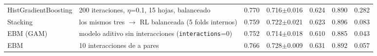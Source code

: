\begin{table}[t]
\begin{tabular}{@{}p{2.9cm}p{7.6cm}ccccc@{}}
HistGradientBoosting & 200 iteraciones, $\eta$=0.1, 15 hojas, balanceado & 0.770 & 0.716$\pm$0.016 & 0.624 & 0.890 & 0.282 \\
Stacking & los mismos tres $\rightarrow$ RL balanceada (5 folds internos) & 0.759 & 0.722$\pm$0.021 & 0.623 & 0.896 & 0.083 \\
EBM (GAM) & modelo aditivo sin interacciones (\texttt{interactions}=0) & 0.752 & 0.714$\pm$0.018 & 0.610 & 0.885 & 0.043 \\
EBM & 10 interacciones de a pares & 0.766 & 0.728$\pm$0.009 & 0.631 & 0.892 & 0.057 \\
\bottomrule
\end{tabular}
\end{table}
